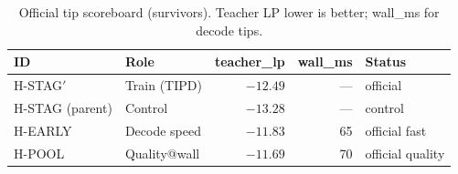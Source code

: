 \begin{table}[t]
\centering
\caption{Official tip scoreboard (survivors). Teacher LP lower is better; wall\_ms for decode tips.}
\label{tab:tips}
\begin{tabular}{llrrl}
\toprule
ID & Role & teacher\_lp & wall\_ms & Status \\
\midrule
H-STAG$'$ & Train (TIPD) & $-12.49$ & --- & official \\
H-STAG (parent) & Control & $-13.28$ & --- & control \\
H-EARLY & Decode speed & $-11.83$ & 65 & official fast \\
H-POOL & Quality@wall & $-11.69$ & 70 & official quality \\
\bottomrule
\end{tabular}
\end{table}
